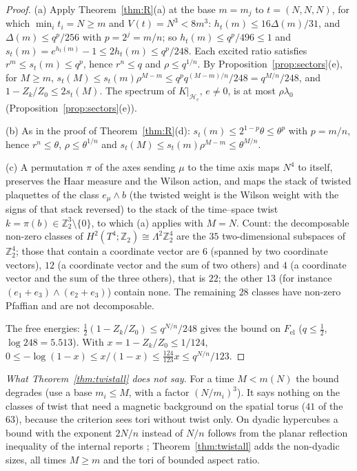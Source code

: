 \documentclass[11pt,a4paper]{article}
\theoremstyle{plain}
\theoremstyle{definition}
\theoremstyle{remark}
\numberwithin{equation}{section}
\newcommand{\Z}{\mathbb{Z}}
\begin{document}
\begin{proof}
(a) Apply Theorem~\ref{thm:R}(a) at the base $m=m_j$ to $t=(N,N,N)$, for which $\min_it_i=N\ge m$ and $V(t)=N^3<8m^3$: $h_t(m)\le16\Delta(m)/31$, and $\Delta(m)\le q^p/256$ with $p=2^j=m/n$; so $h_t(m)\le q^p/496\le1$ and $s_t(m)=e^{h_t(m)}-1\le2h_t(m)\le q^p/248$. Each excited ratio satisfies $r^m\le s_t(m)\le q^p$, hence $r^n\le q$ and $\rho\le q^{1/n}$. By Proposition~\ref{prop:sectors}(e), for $M\ge m$, $s_t(M)\le s_t(m)\rho^{M-m}\le q^{p}q^{(M-m)/n}/248=q^{M/n}/248$, and $1-Z_k/Z_0\le2s_t(M)$. The spectrum of $K|_{\mathcal H_e}$, $e\ne0$, is at most $\rho\lambda_0$ (Proposition~\ref{prop:sectors}(e)).

(b) As in the proof of Theorem~\ref{thm:R}(d): $s_t(m)\le2^{1-p}\theta\le\theta^p$ with $p=m/n$, hence $r^n\le\theta$, $\rho\le\theta^{1/n}$ and $s_t(M)\le s_t(m)\rho^{M-m}\le\theta^{M/n}$.

(c) A permutation $\pi$ of the axes sending $\mu$ to the time axis maps $N^4$ to itself, preserves the Haar measure and the Wilson action, and maps the stack of twisted plaquettes of the class $e_\mu\wedge b$ (the twisted weight is the Wilson weight with the signs of that stack reversed) to the stack of the time--space twist $k=\pi(b)\in\Z_2^3\setminus\{0\}$, to which (a) applies with $M=N$. Count: the decomposable non-zero classes of $H^2(T^4;\Z_2)\cong\Lambda^2\Z_2^4$ are the $35$ two-dimensional subspaces of $\Z_2^4$; those that contain a coordinate vector are $6$ (spanned by two coordinate vectors), $12$ (a coordinate vector and the sum of two others) and $4$ (a coordinate vector and the sum of the three others), that is $22$; the other $13$ (for instance $(e_1+e_3)\wedge(e_2+e_3)$) contain none. The remaining $28$ classes have non-zero Pfaffian and are not decomposable.

The free energies: $\frac12(1-Z_k/Z_0)\le q^{N/n}/248$ gives the bound on $F_{\mathrm{el}}$ ($q\le\frac12$, $\log248=5.513$). With $x=1-Z_k/Z_0\le1/124$, $0\le-\log(1-x)\le x/(1-x)\le\frac{124}{123}x\le q^{N/n}/123$.
\end{proof}
\emph{What Theorem~\ref{thm:twistall} does not say.} For a time $M<m(N)$ the bound degrades (use a base $m_i\le M$, with a factor $(N/m_i)^3$). It says nothing on the classes of twist that need a magnetic background on the spatial torus ($41$ of the $63$), because the criterion sees tori without twist only. On dyadic hypercubes a bound with the exponent $2N/n$ instead of $N/n$ follows from the planar reflection inequality of the internal reports \cite{internal}; Theorem~\ref{thm:twistall} adds the non-dyadic sizes, all times $M\ge m$ and the tori of bounded aspect ratio.
\end{document}
